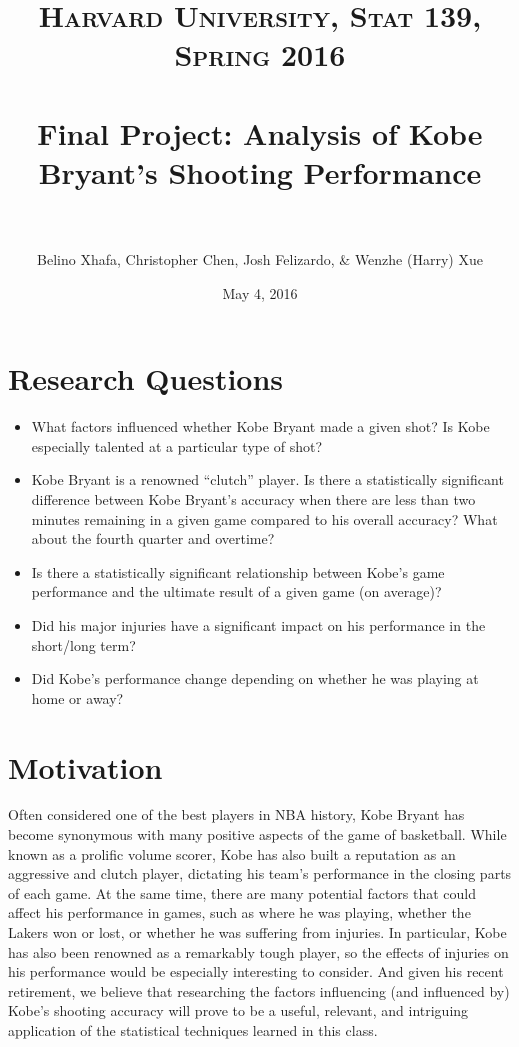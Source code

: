 \documentclass[paper=a4, fontsize=11pt]{scrartcl} %
\title{ 
\normalfont \normalsize 
\textsc{Harvard University, Stat 139, Spring 2016} \\ [25pt] %
\horrule{0.5pt} \\[0.4cm] %
\huge Final Project: Analysis of Kobe Bryant's Shooting Performance \\ %
\horrule{2pt} \\[0.5cm] %
}
\author{Belino Xhafa, Christopher Chen, Josh Felizardo, \& Wenzhe (Harry) Xue}
\date{\normalsize May 4, 2016} %
\numberwithin{equation}{section} %
\numberwithin{figure}{section} %
\numberwithin{table}{section} %
\begin{document}
\maketitle %
\section{Research Questions}
\begin{itemize}
	\item What factors influenced whether Kobe Bryant made a given shot? Is Kobe especially talented at a particular type of shot?
	\item Kobe Bryant is a renowned ``clutch'' player. Is there a statistically significant difference between Kobe Bryant's accuracy when there are less than two minutes remaining in a given game compared to his overall accuracy? What about the fourth quarter and overtime?
	\item Is there a statistically significant relationship between Kobe's game performance and the ultimate result of a given game (on average)?
	\item Did his major injuries have a significant impact on his performance in the short/long term?
	\item Did Kobe's performance change depending on whether he was playing at home or away?
\end{itemize}
\section{Motivation}
\hspace*{1cm}Often considered one of the best players in NBA history, Kobe Bryant has become synonymous with many positive aspects of the game of basketball. While known as a prolific volume scorer, Kobe has also built a reputation as an aggressive and clutch player, dictating his team's performance in the closing parts of each game. At the same time, there are many potential factors that could affect his performance in games, such as where he was playing, whether the Lakers won or lost, or whether he was suffering from injuries. In particular, Kobe has also been renowned as a remarkably tough player, so the effects of injuries on his performance would be especially interesting to consider. And given his recent retirement, we believe that researching the factors influencing (and influenced by) Kobe's shooting accuracy will prove to be a useful, relevant, and intriguing application of the statistical techniques learned in this class. 
\end{document}
